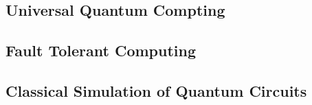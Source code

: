 \documentclass{standalone}
\begin{document}
\subsection{Universal Quantum Compting}
\subsection{Fault Tolerant Computing}
\subsection{Classical Simulation of Quantum Circuits}

\ifstandalone

\fi
\end{document}
